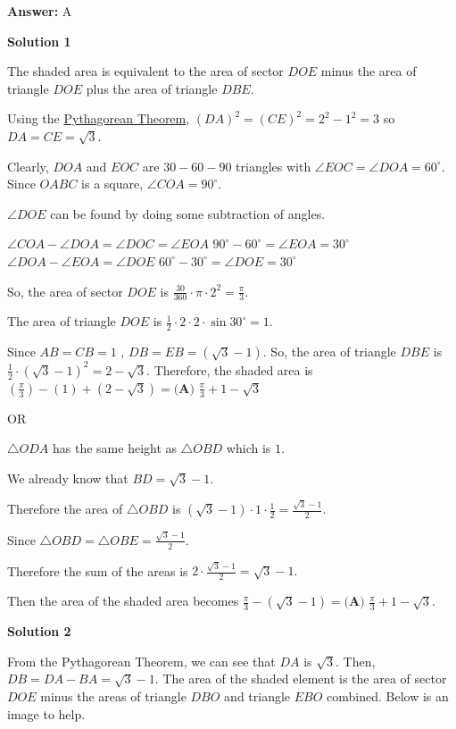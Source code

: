\begin{enumerate}
 \textbf{Answer: }A



\textbf{Solution 1}

The shaded area is equivalent to the area of sector $DOE$ minus the area of triangle $DOE$ plus the area of triangle $DBE$. 

 Using the \href{https://artofproblemsolving.com/wiki/index.php?title=Pythagorean\_Theorem}{Pythagorean Theorem}, $(DA)^2=(CE)^2=2^2-1^2=3$ so $DA=CE=\sqrt{3}$.

 Clearly, $DOA$ and $EOC$ are $30-60-90$ triangles with $\angle EOC = \angle DOA = 60^\circ$. Since $OABC$ is a square, $\angle COA = 90^\circ$.

 $\angle DOE$ can be found by doing some subtraction of angles. 

 $\angle COA - \angle DOA = \angle DOC = \angle EOA$
$90^\circ - 60^\circ = \angle EOA = 30^\circ$
$\angle DOA - \angle EOA = \angle DOE$
$60^\circ - 30^\circ = \angle DOE = 30^\circ$

 So, the area of sector $DOE$ is $\frac{30}{360} \cdot \pi \cdot 2^2 = \frac{\pi}{3}$.

 The area of triangle $DOE$ is $\frac{1}{2}\cdot 2 \cdot 2 \cdot \sin 30^\circ = 1$.

 Since $AB=CB=1$ , $DB=EB=(\sqrt{3}-1)$. So, the area of triangle $DBE$ is $\frac{1}{2} \cdot (\sqrt{3}-1)^2 = 2-\sqrt{3}$. Therefore, the shaded area is $(\frac{\pi}{3}) - (1) + (2-\sqrt{3}) = \boxed{\textbf{(A) }\frac{\pi}{3} + 1 - \sqrt{3}}$

 OR

 $\triangle{ODA}$ has the same height as $\triangle{OBD}$ which is $1.$

 We already know that $BD = \sqrt{3} - 1.$

 Therefore the area of $\triangle{OBD}$ is $(\sqrt{3}-1) \cdot 1 \cdot \frac{1}{2} = \frac{\sqrt{3}-1}{2}.$

 Since $\triangle{OBD} = \triangle{OBE} = \frac{\sqrt{3}-1}{2}.$

 Therefore the sum of the areas is $2 \cdot \frac{\sqrt{3}-1}{2} = \sqrt{3}-1.$

 Then the area of the shaded area becomes $\frac{\pi}{3} - (\sqrt{3} - 1) = \boxed{\textbf{(A) }\frac{\pi}{3} +1 - \sqrt{3}}.$




\textbf{Solution 2}

From the Pythagorean Theorem, we can see that $DA$ is $\sqrt{3}$. Then, $DB = DA - BA = \sqrt{3} - 1$. The area of the shaded element is the area of sector $DOE$ minus the areas of triangle $DBO$ and triangle $EBO$ combined. Below is an image to help.


\end{enumerate}
